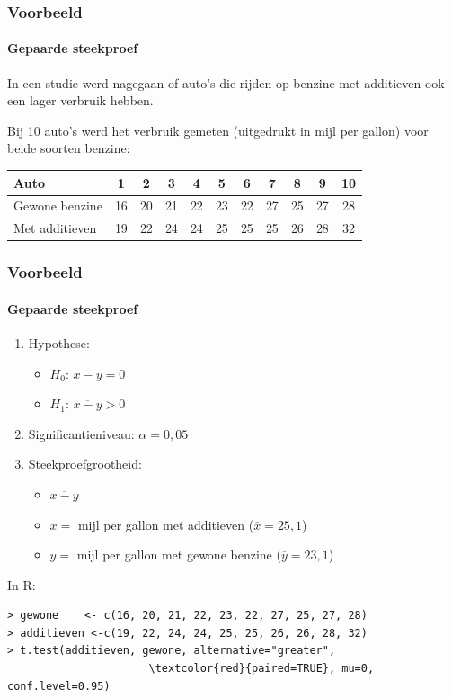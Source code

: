 \documentclass{beamer}
\begin{document}
\begin{frame}
  \frametitle{Voorbeeld}
  \framesubtitle{Gepaarde steekproef}
  
  In een studie werd nagegaan of auto's die rijden op benzine met additieven ook een lager verbruik hebben.
  
  Bij 10 auto's werd het verbruik gemeten (uitgedrukt in mijl per gallon) voor beide soorten benzine:
  
  \vspace{.5cm}
  \centering
  \begin{tabular}{|l|c|c|c|c|c|c|c|c|c|c|}
  	\hline
  	Auto           & 1  & 2  & 3  & 4  & 5  & 6  & 7  & 8  & 9  & 10 \\ \hline
  	Gewone benzine & 16 & 20 & 21 & 22 & 23 & 22 & 27 & 25 & 27 & 28 \\ \hline
  	Met additieven & 19 & 22 & 24 & 24 & 25 & 25 & 25 & 26 & 28 & 32 \\ \hline
  \end{tabular} 
\end{frame}

\begin{frame}[fragile]
  \frametitle{Voorbeeld}
  \framesubtitle{Gepaarde steekproef}
\begin{enumerate}
    \item Hypothese:
    \begin{itemize}
        \item $H_0$: $\overline{x-y} = 0$
        \item $H_1$: $\overline{x-y} > 0$
    \end{itemize}
    \item Significantieniveau: $\alpha = 0,05$
    \item Steekproefgrootheid:
    \begin{itemize}
        \item $\overline{x-y}$
        \item $x =$ mijl per gallon met additieven ($\overline{x}=25,1$)
        \item $y =$ mijl per gallon met gewone benzine ($\overline{y}=23,1$)
    \end{itemize}
\end{enumerate}
\vfill
In R:
{\footnotesize
    \begin{Verbatim}[commandchars=\\\{\}]
> gewone    <- c(16, 20, 21, 22, 23, 22, 27, 25, 27, 28)
> additieven <-c(19, 22, 24, 24, 25, 25, 26, 26, 28, 32)
> t.test(additieven, gewone, alternative="greater",
                      \textcolor{red}{paired=TRUE}, mu=0, conf.level=0.95)
    \end{Verbatim}
}
\end{frame}
\end{document}
